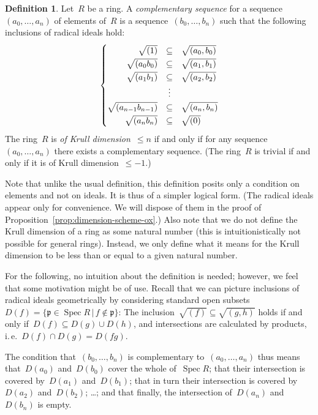 \documentclass[10pt]{amsart}
\makeatletter
\theoremstyle{definition}
\newtheorem{defn}{Definition}[section]
\theoremstyle{plain}
\theoremstyle{remark}
\newcommand{\ppp}{\mathfrak{p}}
\DeclareMathOperator{\Spec}{Spec}
\newcommand{\?}{\,{:}\,}
\renewcommand{\_}{\mathpunct{.}\,}
\newcommand{\ie}{i.\,e.\@\xspace}
\makeatother
\begin{document}
\begin{defn}Let~$R$ be a ring. A \emph{complementary sequence} for a
sequence~$(a_0,\ldots,a_n)$ of elements of~$R$ is a sequence~$(b_0,\ldots,b_n)$
such that the following inclusions of radical ideals hold:
\[ \renewcommand{\arraystretch}{1.3}
\left\{\begin{array}{@{}rcl@{}}
  \sqrt{(1)} &\subseteq& \sqrt{(a_0,b_0)} \\
  \sqrt{(a_0 b_0)} &\subseteq& \sqrt{(a_1,b_1)} \\
  \sqrt{(a_1 b_1)} &\subseteq& \sqrt{(a_2,b_2)} \\
  &\vdots \\
  \sqrt{(a_{n-1} b_{n-1})} &\subseteq& \sqrt{(a_n,b_n)} \\
  \sqrt{(a_n b_n)} &\subseteq& \sqrt{(0)}
\end{array}\right. \]
The ring~$R$ is \emph{of Krull dimension~$\leq n$} if
and only if for any sequence~$(a_0,\ldots,a_n)$ there exists a
complementary sequence. (The ring~$R$ is trivial if and only if it is
of Krull dimension~$\leq -1$.)
\end{defn}
Note that unlike the usual definition, this definition posits only a condition
on elements and not on ideals. It is thus of a simpler logical form.
(The radical ideals appear only for convenience. We will dispose of them in the
proof of Proposition~\ref{prop:dimension-scheme-ox}.)
Also note that we do not define the Krull dimension of a ring as some natural
number (this is intuitionistically not possible for general rings). Instead, we
only define what it means for the Krull dimension to be less than or equal to
a given natural number.

For the following, no intuition about the definition is needed; however, we
feel that some motivation might be of use. Recall that we can picture inclusions of
radical ideals geometrically by considering standard open subsets~$D(f) = \{
\ppp \in \Spec R \,|\, f \not\in \ppp \}$: The inclusion~$\sqrt{(f)} \subseteq
\sqrt{(g,h)}$ holds if and only if~$D(f) \subseteq D(g) \cup D(h)$, and
intersections are calculated by products, \ie~$D(f) \cap D(g) = D(fg)$.

The condition that~$(b_0,\ldots,b_n)$ is complementary to~$(a_0,\ldots,a_n)$
thus means that~$D(a_0)$ and~$D(b_0)$ cover the whole of~$\Spec R$; that their
intersection is covered by~$D(a_1)$ and~$D(b_1)$; that in turn their
intersection is covered by~$D(a_2)$ and~$D(b_2)$; \ldots; and that finally, the
intersection of~$D(a_n)$ and~$D(b_n)$ is empty.
\end{document}
